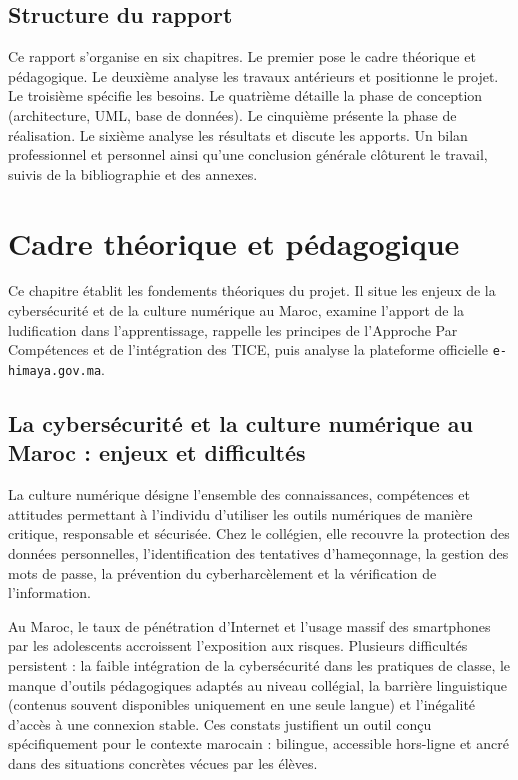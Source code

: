 \documentclass[12pt, a4paper, oneside]{report}
\begin{document}
\section*{Structure du rapport}
Ce rapport s'organise en six chapitres. Le premier pose le cadre théorique et pédagogique. Le deuxième analyse les travaux antérieurs et positionne le projet. Le troisième spécifie les besoins. Le quatrième détaille la phase de conception (architecture, UML, base de données). Le cinquième présente la phase de réalisation. Le sixième analyse les résultats et discute les apports. Un bilan professionnel et personnel ainsi qu'une conclusion générale clôturent le travail, suivis de la bibliographie et des annexes.

\chapter{Cadre théorique et pédagogique}

Ce chapitre établit les fondements théoriques du projet. Il situe les enjeux de la cybersécurité et de la culture numérique au Maroc, examine l'apport de la ludification dans l'apprentissage, rappelle les principes de l'Approche Par Compétences et de l'intégration des TICE, puis analyse la plateforme officielle \texttt{e-himaya.gov.ma}.

\section{La cybersécurité et la culture numérique au Maroc : enjeux et difficultés}
La culture numérique désigne l'ensemble des connaissances, compétences et attitudes permettant à l'individu d'utiliser les outils numériques de manière critique, responsable et sécurisée. Chez le collégien, elle recouvre la protection des données personnelles, l'identification des tentatives d'hameçonnage, la gestion des mots de passe, la prévention du cyberharcèlement et la vérification de l'information.

Au Maroc, le taux de pénétration d'Internet et l'usage massif des smartphones par les adolescents accroissent l'exposition aux risques. Plusieurs difficultés persistent : la faible intégration de la cybersécurité dans les pratiques de classe, le manque d'outils pédagogiques adaptés au niveau collégial, la barrière linguistique (contenus souvent disponibles uniquement en une seule langue) et l'inégalité d'accès à une connexion stable. Ces constats justifient un outil conçu spécifiquement pour le contexte marocain : bilingue, accessible hors-ligne et ancré dans des situations concrètes vécues par les élèves.
\end{document}
